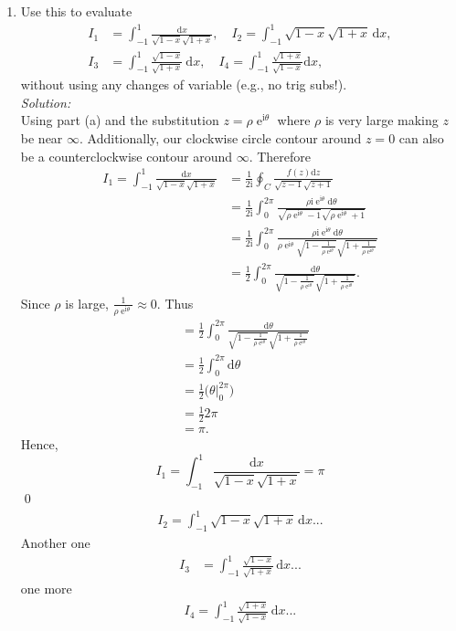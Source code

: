 \documentclass[10pt]{amsart}
\newcommand{\D}{\mathrm{d}}
\newcommand{\I}{\mathrm{i}}
\DeclareMathOperator{\E}{e}
\theoremstyle{nonumberplain}
\begin{document}
\begin{enumerate}[label={\bf {\arabic*}:}]
\begin{enumerate}
\item Use this to evaluate
\begin{align*}
	I_1 &= \int_{-1}^1 \frac{\D x}{\sqrt{1 -x} \sqrt{1+x}}, \quad
	I_2 = \int_{-1}^1 \sqrt{1 -x} \sqrt{1 + x}\, \D x, \\
	I_3 &= \int_{-1}^1 \frac{\sqrt{1 -x}}{ \sqrt{1 + x}}\ \D x,
	\quad   I_4 = \int_{-1}^1 \frac{\sqrt{1  +x}}{ \sqrt{1 - x}} \D x,
\end{align*}
without using any changes of variable (e.g., no trig subs!).\\

\noindent
\textit{Solution:} \\
Using part (a) and the substitution $z = \rho \E^{\I \theta}$ where $\rho$ is very large making $z$ be near $\infty$.
Additionally, our clockwise circle contour around $z=0$ can also be a counterclockwise contour around $\infty$.
Therefore
\begin{align*}
I_1 = \int_{-1}^1 \frac{\D x}{\sqrt{1 -x} \sqrt{1+x}}
	&= \frac{1}{2\I} \oint_C \frac{f(z)\D z}{\sqrt{z -1} \sqrt{z + 1}} \\
	&= \frac{1}{2\I} \int_0^{2\pi} \frac {\rho \I \E^{\I \theta} \D \theta}{\sqrt{\rho \E^{\I \theta} -1} \sqrt{\rho \E^{\I \theta} + 1}} \\
	&= \frac{1}{2\I} \int_0^{2\pi} \frac {\rho \I \E^{\I \theta} \D \theta}{\rho \E^{\I \theta} \sqrt{1 - \frac 1{\rho \E^{\I \theta}}} \sqrt{1 + \frac 1{\rho \E^{\I \theta}}}} \\
	&= \frac{1}{2} \int_0^{2\pi} \frac { \D \theta}{\sqrt{1 - \frac 1{\rho \E^{\I \theta}}} \sqrt{1 + \frac 1{\rho \E^{\I \theta}}}}.
\end{align*}
Since $\rho$ is large, $\frac 1{\rho \E^{\I \theta}} \approx 0$.
Thus
\begin{align*}
	&= \frac{1}{2} \int_0^{2\pi} \frac { \D \theta}{\sqrt{1 - \frac 1{\rho \E^{\I \theta}}} \sqrt{1 + \frac 1{\rho \E^{\I \theta}}}} \\
	&= \frac 1 2 \int_0^{2\pi} \D \theta \\
	&= \frac 1 2 \Big( \theta \big|_0^{2\pi} \Big) \\
	&= \frac 1 2 2 \pi \\
	&= \pi.
\end{align*} 
Hence,
$$
I_1 = \int_{-1}^1 \frac{\D x}{\sqrt{1 -x} \sqrt{1+x}} = \pi
$$ \qed \\

\begin{align*}
I_2 = \int_{-1}^1 \sqrt{1 -x} \sqrt{1 + x}\, \D x...
\end{align*}
Another one
\begin{align*}
I_3 &= \int_{-1}^1 \frac{\sqrt{1 -x}}{ \sqrt{1 + x}}\, \D x...
\end{align*}
one more
\begin{align*}
I_4 = \int_{-1}^1 \frac{\sqrt{1  +x}}{ \sqrt{1 - x}}\, \D x...
\end{align*}
\end{enumerate}
\newpage


\end{enumerate}
\end{document}
